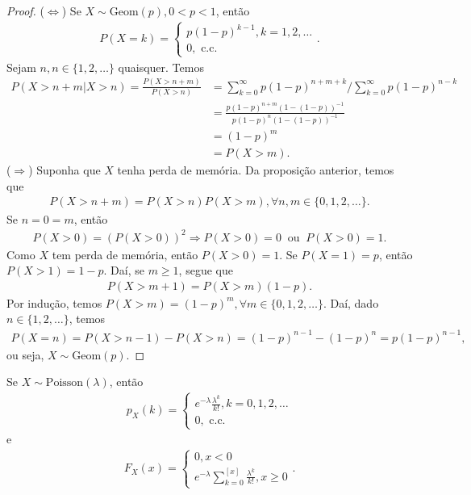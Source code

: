 \documentclass[../Notas.tex]{subfiles}
\begin{document}
\begin{proof}
($\Leftrightarrow$) Se $X\sim\text{Geom}(p), 0 < p < 1$, então
\begin{align*}
    P(X=k) = \begin{cases}
    p(1-p)^{k-1}, k = 1, 2, \dots \\
    0, \text{ c.c.}
    \end{cases}.
\end{align*}
Sejam $n,n\in\{1, 2, \dots\}$ quaisquer. Temos
\begin{align*}
    P(X > n+m | X > n) = \frac{P(X > n+m)}{P(X>n)} &= \sum_{k=0}^{\infty}p(1-p)^{n+m+k}/\sum_{k=0}^{\infty}p(1-p)^{n-k} \\
    &= \frac{ p(1-p)^{n+m}(1-(1-p))^{-1} }{ p(1-p)^n(1-(1-p))^{-1} } \\
    &= (1-p)^m \\
    &= P(X>m).
\end{align*}
($\Rightarrow$) Suponha que $X$ tenha perda de memória. Da proposição anterior, temos que
\begin{align*}
    P(X > n+m) = P(X>n)P(X>m), \forall n,m\in\{0,1,2,\dots\}.
\end{align*}
Se $n=0=m$, então
\begin{align*}
    P(X>0) = (P(X>0))^2 \Rightarrow P(X>0) = 0 \ \text{ ou } \ P(X>0) = 1.
\end{align*}
Como $X$ tem perda de memória, então $P(X>0) = 1$. Se $P(X=1) = p$, então $P(X>1) = 1 - p$. Daí, se $m\geq 1$, segue que
\begin{align*}
    P(X > m+1) = P(X>m)(1-p).
\end{align*}
Por indução, temos $P(X>m) = (1-p)^m, \forall m\in\{0, 1, 2, \dots\}$. Daí, dado $n\in\{1, 2, \dots\}$, temos
\begin{align*}
    P(X=n) = P(X>n-1) - P(X>n) = (1-p)^{n-1} - (1-p)^n = p(1-p)^{n-1},
\end{align*}
ou seja, $X\sim\text{Geom}(p)$.
\end{proof}

\begin{example}
Se $X\sim\text{Poisson}(\lambda)$, então
\begin{align*}
    p_X(k) = \begin{cases}
    e^{-\lambda}\frac{\lambda^k}{k!}, k = 0, 1, 2, \dots \\
    0, \text{ c.c.}
    \end{cases}
\end{align*}
e
\begin{align*}
    F_X(x) = \begin{cases}
    0, x < 0 \\
    e^{-\lambda}\sum_{k=0}^{[x]}\frac{\lambda^k}{k!}, x\geq 0
    \end{cases}.
\end{align*}
\end{example}
\end{document}
